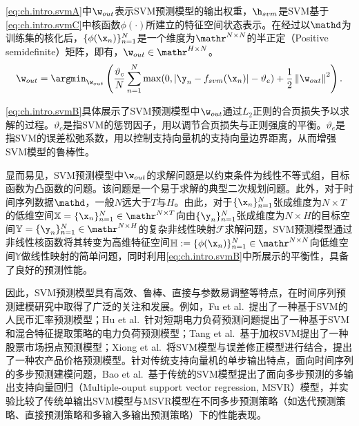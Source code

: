 \autoref{eq:ch.intro.svmA}中\(\w_{out}\)表示SVM预测模型的输出权重，\(\h_{svm}\)是SVM基于\autoref{eq:ch.intro.svmC}中核函数\(\phi(\cdot)\)所建立的特征空间状态表示。在经过以\(\mathd\)为训练集的核化后，\(\{\phi(\x_n)\}_{n=1}^N\)是一个维度为\(\mathr^{N\times N}\)的半正定（Positive semidefinite）矩阵，即有，\(\w_{out} \in \mathr^{H\times N}\)。
{\setlength{\abovedisplayskip}{12pt plus 3pt}
\setlength{\belowdisplayskip}{12pt plus 3pt}
\begin{equation}
    \w_{out} = \argmin_{\w_{out} }\left(\frac{\vartheta_{c}}{N}\sum^{N}_{n=1}\max(0, \left\lvert \y_n - f_{svm}(\x_n)\right\rvert  - \vartheta_{e}) + \frac{1}{2}\left\lVert \w_{out} \right\rVert^2\right)  .\label{eq:ch.intro.svmB}
\end{equation}
}

\autoref{eq:ch.intro.svmB}具体展示了SVM预测模型中\(\w_{out}\)通过$L_2$正则的合页损失予以求解的过程。\(\vartheta_{c}\)是指SVM的惩罚因子，用以调节合页损失与正则强度的平衡。\(\vartheta_{e}\)是指SVM的误差松弛系数，用以控制支持向量机的支持向量边界距离，从而增强SVM模型的鲁棒性。

显而易见，SVM预测模型中\(\w_{out}\)的求解问题是以约束条件为线性不等式组，目标函数为凸函数的问题。该问题是一个易于求解的典型二次规划问题。此外，对于时间序列数据\(\mathd\)，一般\(N\)远大于\(T\)与\(H\)。由此，对于\(\{\x_n\}_{n=1}^N\)张成维度为\(N \times T\)的低维空间\(\mathbb{X} = \{\x_n\}_{n=1}^N \in \mathr^{N \times T}\)向由\(\{\y_n\}_{n=1}^N\)张成维度为\(N \times H\)的目标空间\(\mathbb{Y} = \{\y_n\}_{n=1}^N \in \mathr^{N \times H}\)的复杂非线性映射\(\mathcal{F}\)求解问题，SVM预测模型通过非线性核函数将其转变为高维特征空间\(\mathbb{H} := \{\phi(\x_n)\}_{n=1}^N \in \mathr^{N \times N}\)向低维空间\(\mathbb{Y}\)做线性映射的简单问题，同时利用\autoref{eq:ch.intro.svmB}中所展示的平衡性，具备了良好的预测性能。

因此，SVM预测模型具有高效、鲁棒、直接与参数易调整等特点，在时间序列预测建模研究中取得了广泛的关注和发展。例如，Fu et al.~\cite{fuEvolutionary2019}提出了一种基于SVM的人民币汇率预测模型；Hu et al.~\cite{huHybrid2015}针对短期电力负荷预测问题提出了一种基于SVM和混合特征提取策略的电力负荷预测模型；Tang et al.~\cite{tangNew2019}基于加权SVM提出了一种股票市场拐点预测模型；Xiong et al.~\cite{xiongCombination2015}将SVM模型与误差修正模型进行结合，提出了一种农产品价格预测模型。针对传统支持向量机的单步输出特点，面向时间序列的多步预测建模问题，Bao et al.~\cite{baoMultistepahead2014}基于传统的SVM模型提出了面向多步预测的多输出支持向量回归（Multiple-ouput support vector regression, MSVR）模型，并实验比较了传统单输出SVM模型与MSVR模型在不同多步预测策略（如迭代预测策略、直接预测策略和多输入多输出预测策略）下的性能表现。

